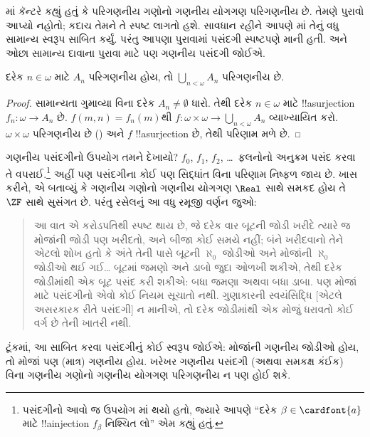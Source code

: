 \documentclass[../../../include/open-logic-section]{subfiles}
\begin{document}
\begin{ex}
\citeyear{Cantor1878}માં કૅન્ટરે કહ્યું
હતું કે પરિગણનીય ગણોનો ગણનીય યોગગણ
પરિગણનીય છે. તેમણે પુરાવો આપ્યો નહોતો;
કદાચ તેમને તે સ્પષ્ટ લાગતો હશે.
સાવધાન રહીને આપણે
માં
તેનું વધુ સામાન્ય સ્વરૂપ સાબિત કર્યું.
પરંતુ આપણા પુરાવામાં પસંદગી સ્પષ્ટપણે
માની હતી. અને ઓછા સામાન્ય દાવાના
પુરાવા માટે પણ ગણનીય પસંદગી જોઈએ.

\begin{thm}
દરેક $n \in \omega$ માટે $A_n$ પરિગણનીય
હોય, તો $\bigcup_{n <
\omega} A_n$ પરિગણનીય છે.
\end{thm}

\begin{proof}
સામાન્યતા ગુમાવ્યા વિના દરેક
$A_n \neq \emptyset$ ધારો. તેથી દરેક
$n \in \omega$ માટે !!a{surjection}
$f_n \colon \omega \to A_n$ છે.
$f(m, n) = f_n(m)$થી
$f \colon \omega \times \omega \to
\bigcup_{n < \omega} A_n$
વ્યાખ્યાયિત કરો. $\omega \times \omega$
પરિગણનીય છે
()
અને $f$ !!a{surjection} છે,
તેથી પરિણામ મળે છે.
\end{proof}
\noindent
ગણનીય પસંદગીનો ઉપયોગ તમને દેખાયો?
$f_0$, $f_1$, $f_2$, \dots\ ફલનોનો અનુક્રમ
પસંદ કરવા તે વપરાઈ.\footnote{પસંદગીનો
આવો જ ઉપયોગ
માં
થયો હતો, જ્યારે આપણે ``દરેક
$\beta \in \cardfont{a}$ માટે
!!a{injection} $f_\beta$ નિશ્ચિત લો''
એમ કહ્યું હતું.} અહીં પણ પસંદગીના
કોઈ પણ સિદ્ધાંત વિના પરિણામ નિષ્ફળ
જાય છે. ખાસ કરીને,
\citet{FefermanLevy1963}એ બતાવ્યું કે
ગણનીય ગણોનો ગણનીય યોગગણ
$\Real$ સાથે સમકદ હોય તે $\ZF$ સાથે
સુસંગત છે. 
પરંતુ રસેલનું આ વધુ રમૂજી
વર્ણન જુઓ:
\begin{quote}
  આ વાત એ કરોડપતિથી સ્પષ્ટ થાય છે, જે
  દરેક વાર બૂટની જોડી ખરીદે ત્યારે જ
  મોજાંની જોડી પણ ખરીદતો, અને બીજા
  કોઈ સમયે નહીં; બંને ખરીદવાનો તેને
  એટલો શોખ હતો કે અંતે તેની પાસે
  બૂટની $\aleph_0$ જોડીઓ અને મોજાંની
  $\aleph_0$ જોડીઓ થઈ ગઈ\dots\@
  બૂટમાં જમણો અને ડાબો જુદા ઓળખી શકીએ,
  તેથી દરેક જોડીમાંથી એક બૂટ પસંદ કરી
  શકીએ: બધા જમણા અથવા બધા ડાબા.
  પણ મોજાં માટે પસંદગીનો એવો કોઈ
  નિયમ સૂચાતો નથી. ગુણાકારની સ્વયંસિદ્ધિ
  [એટલે અસરકારક રીતે પસંદગી] ન માનીએ,
  તો દરેક જોડીમાંથી એક મોજું ધરાવતો
  કોઈ વર્ગ છે તેની ખાતરી નથી.
  \citep[p.~126]{Russell1919}
\end{quote}
ટૂંકમાં, આ સાબિત કરવા પસંદગીનું કોઈ
સ્વરૂપ જોઈએ: મોજાંની ગણનીય જોડીઓ હોય,
તો મોજાં પણ (માત્ર) ગણનીય હોય.
ખરેખર ગણનીય પસંદગી (અથવા સમકક્ષ
કંઈક) વિના ગણનીય ગણોનો ગણનીય
યોગગણ પરિગણનીય ન પણ હોઈ શકે.
\end{ex}
\end{document}
